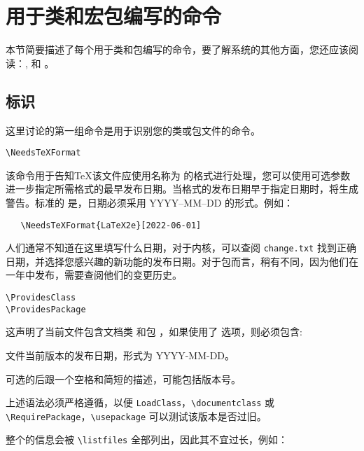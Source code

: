 \documentclass[12pt]{ltxguide}
\begin{document}
\section{用于类和宏包编写的命令}
\label{Sec:commands}

本节简要描述了每个用于类和包编写的命令，要了解系统的其他方面，您还应该阅读：\emph{\LaTeXbook}, \emph{\LaTeXcomp} 和 \emph{\usrguide}。

\subsection{标识}
这里讨论的第一组命令是用于识别您的类或包文件的命令。

\begin{decl}
    \verb|\NeedsTeXFormat|  
\end{decl}

该命令用于告知\TeX{}该文件应使用名称为  的格式进行处理，您可以使用可选参数  进一步指定所需格式的最早发布日期。当格式的发布日期早于指定日期时，将生成警告。标准的  是\LaTeXe{}，日期必须采用 \textsc{YYYY--MM--DD} 的形式。例如：
\begin{verbatim}
   \NeedsTeXFormat{LaTeX2e}[2022-06-01]
\end{verbatim}

人们通常不知道在这里填写什么日期，对于内核，可以查阅 \verb|change.txt| 找到正确日期，并选择您感兴趣的新功能的发布日期。对于包而言，稍有不同，因为他们在一年中发布，需要查阅他们的变更历史。

\begin{decl}
\verb|\ProvidesClass|   \\
\verb|\ProvidesPackage|  
\end{decl}
这声明了当前文件包含文档类  和包 ，如果使用了  选项，则必须包含:
\begin{compactenum}
\item 文件当前版本的发布日期，形式为 \textsc{YYYY-MM-DD}。
\item 可选的后跟一个空格和简短的描述，可能包括版本号。
\end{compactenum}

上述语法必须严格遵循，以便 \verb|LoadClass|，\verb|\documentclass| 或 \verb|\RequirePackage|，\verb|\usepackage| 可以测试该版本是否过旧。

整个的信息会被 \verb|\listfiles| 全部列出，因此其不宜过长，例如：
\end{document}
